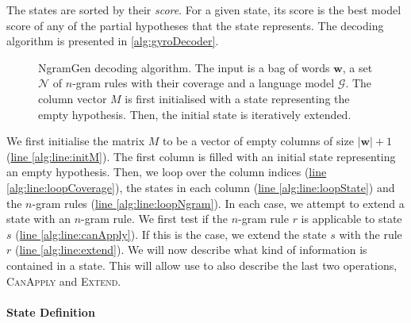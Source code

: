The states are sorted by their \emph{score}.
For a given state, its score is the best model score of any of the partial
hypotheses that the state represents.
The decoding algorithm is presented in \autoref{alg:gyroDecoder}.
%
\begin{figure}
  \begin{algorithmic}[1]
       \hypertarget{alg:line:initM}{} \label{alg:line:initM}
       \hypertarget{alg:line:loopCoverage}{} \label{alg:line:loopCoverage}
         \hypertarget{alg:line:loopState}{} \label{alg:line:loopState}
           \hypertarget{alg:line:loopNgram}{} \label{alg:line:loopNgram}
             \hypertarget{alg:line:canApply}{} \label{alg:line:canApply}
               \hypertarget{alg:line:extend}{} \label{alg:line:extend}
            \EndIf
          \EndFor
        \EndFor
      \EndFor
    \EndFunction
  \end{algorithmic}
  \caption{NgramGen decoding algorithm. The input is a bag of words $\bm{w}$,
  a set $\mathcal{N}$ of $n$-gram rules with their coverage and a language model
  $\mathcal{G}$. The column vector $M$ is first initialised with a state representing
  the empty hypothesis. Then, the initial state is iteratively extended.}
  \label{alg:gyroDecoder}
\end{figure}
%
We first initialise the matrix $M$ to be a vector of empty
columns of size $|\bm{w}| + 1$ (\hyperlink{alg:line:initM}{line \ref{alg:line:initM}}).
The first column is filled with an initial state representing an empty hypothesis.
Then, we loop over the column indices
(\hyperlink{alg:line:initM}{line \ref{alg:line:loopCoverage}}), the states in each
column (\hyperlink{alg:line:loopState}{line \ref{alg:line:loopState}}) and the
$n$-gram rules (\hyperlink{alg:line:loopNgram}{line \ref{alg:line:loopNgram}}).
In each case, we attempt to extend a state with an $n$-gram rule. We first test
if the $n$-gram rule $r$ is applicable to state $s$
(\hyperlink{alg:line:canApply}{line \ref{alg:line:canApply}}). If this
is the case, we extend the state $s$ with the rule $r$
(\hyperlink{alg:line:extend}{line \ref{alg:line:extend}}).
We will now describe what kind of information is contained
in a state. This will allow use to also describe the last two operations, \textsc{CanApply}
and \textsc{Extend}.

\paragraph{State Definition}
\label{sec:gyroStateDefinition}

